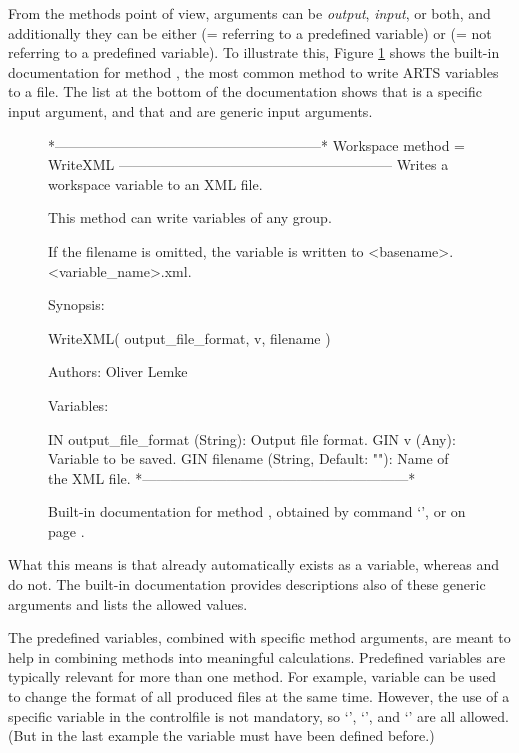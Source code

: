 From the methods point of view, arguments can be \emph{output},
\emph{input}, or both, and additionally they can be either
\emph{} (= referring to a predefined variable) or
\emph{} (= not referring to a predefined
variable). To illustrate this, Figure \ref{fig:WriteXML} shows the
built-in documentation for method , the most
common method to write ARTS variables to a file. The list at the
bottom of the documentation shows that
 is a specific input argument, and
that  and  are generic input
arguments.

\begin{figure}
\footnotesize
\begin{code}
*---------------------------------------------------------*
Workspace method = WriteXML
-----------------------------------------------------------
Writes a workspace variable to an XML file.

This method can write variables of any group.

If the filename is omitted, the variable is written
to <basename>.<variable_name>.xml.

Synopsis:

WriteXML( output_file_format, v, filename )

Authors: Oliver Lemke

Variables:

IN    output_file_format (String): Output file format.
GIN   v (Any): Variable to be saved.
GIN   filename (String, Default: ""): Name of the XML file.
*---------------------------------------------------------*
\end{code}
\caption{Built-in documentation for method , obtained by
  command `', or on page
  .}
\label{fig:WriteXML}
\end{figure}

What this means is that  already automatically
exists as a variable, whereas  and 
do not. The built-in documentation provides descriptions also of these generic
arguments and lists the allowed values.

The predefined variables, combined with specific method arguments, are meant to
help in combining methods into meaningful calculations. Predefined variables
are typically relevant for more than one method. For example, variable
 can be used to change the format of all produced
files at the same time. However, the use of a specific variable in the
controlfile is not mandatory, so `', `', and
`' are all allowed. (But in the
last example the variable  must have been defined before.)

